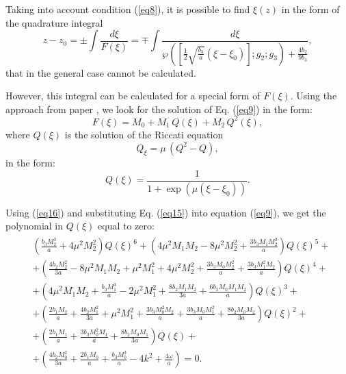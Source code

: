 \documentclass[preprint,12pt]{elsarticle}
\begin{document}
Taking into account condition (\ref{eq8}), it is possible to find \(\xi(z)\) in the form of the quadrature integral 
\begin{equation}
z-z_{0}=\pm\int \frac{d\xi}{F(\xi)}=\mp \int \frac{d\xi}{\wp\left(\left[\frac{1}{2}\sqrt{\frac{b_{3}}{a}}\left(\xi-\xi_{0}\right)\right];g_{2};g_{3}\right) + \frac{4 b_{2}}{9 b_{3}} },
\end{equation}
that in the general case cannot be calculated. 

However, this integral can be calculated for a special form of \(F(\xi)\).
Using the approach from paper \cite{Rad4}, we look for the solution of Eq. (\ref{eq9}) in the form:
\begin{equation} \label{eq15}
F(\xi)=M_{0}+M_{1}\,Q(\xi)+M_{2}\,Q^{2}(\xi),
\end{equation}
where \(Q(\xi)\) is the solution of the Riccati equation
\begin{equation}\label{eq16}
Q_{\xi}=\mu\,(Q^{2}-Q),
\end{equation}
in the form:
\begin{equation}
Q(\xi)=\frac{1}{1+\exp\left(\mu(\xi-\xi_{0})\right)}.
\end{equation}

Using (\ref{eq16}) and substituting Eq. (\ref{eq15}) into equation (\ref{eq9}), we get the polynomial in \(Q(\xi)\) equal to zero:
\begin{equation}
\begin{aligned}
\begin{split}
&\left(\frac{b_{3} M_{2}^{3}}{a}+4 \mu^{2} M_{2}^{2}\right) Q(\xi)^{6}+
\left(4 \mu^{2} M_{1} M_{2}-8 \mu^{2} M_{2}^{2}+\frac{3 b_{3} M_{1} M_{2}^{2}}{a}\right) Q(\xi)^{5}+\\
&+\left(\frac{4 b_{2} M_{2}^{2}}{3 a}-8 \mu^{2} M_{1} M_{2}+\mu^{2} M_{1}^{2}+4 \mu^{2} M_{2}^{2}+\frac{3 b_{3} M_{0} M_{2}^{2}}{a}+\frac{3 b_{3} M_{1}^{2} M_{2}}{a}\right) Q(\xi)^{4}+\\
&+\left(4 \mu^{2} M_{1} M_{2}+\frac{b_{3} M_{1}^{3}}{a}-2 \mu^{2} M_{1}^{2}+\frac{8 b_{2} M_{1} M_{2}}{3 a}+\frac{6 b_{3} M_{0} M_{1} M_{2}}{a}\right) Q(\xi)^{3}+\\
&+\left(\frac{2 b_{1} M_{2}}{a}+\frac{4 b_{2} M_{1}^{2}}{3 a}+\mu^{2} M_{1}^{2}+\frac{3 b_{3} M_{0}^{2} M_{2}}{a}+\frac{3 b_{3} M_{0} M_{1}^{2}}{a}+\frac{8 b_{2} M_{0} M_{2}}{3 a}\right) Q(\xi)^{2}+\\
&+\left(\frac{2 b_{1} M_{1}}{a}+\frac{3 b_{3} M_{0}^{2} M_{1}}{a}+\frac{8 b_{2} M_{0} M_{1}}{3 a}\right) Q(\xi)+\\
&+\left(\frac{4 b_{2} M_{0}^{2}}{3 a}+\frac{2 b_{1} M_{0}}{a}+\frac{b_{3} M_{0}^{3}}{a}-4 k^{2}+\frac{4 \omega}{a}\right)=0.
\end{split}
\end{aligned}
\end{equation}
\end{document}
